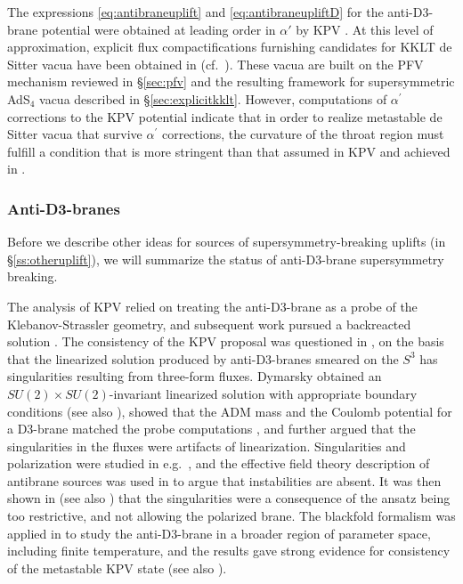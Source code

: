 \documentclass[12pt,a4wide]{article}
\begin{document}
The expressions \eqref{eq:antibraneuplift} and \eqref{eq:antibraneupliftD} for the anti-D3-brane potential were obtained at leading order in $\alpha'$ by KPV \cite{Kachru:2002gs}.  At this level of approximation, 
explicit flux compactifications furnishing candidates for KKLT de Sitter vacua have been obtained in \cite{coni} (cf.~\cite{dstalk}).  These vacua are built on the PFV mechanism reviewed in \S\ref{sec:pfv} and the resulting framework for supersymmetric AdS$_4$ vacua described in \S\ref{sec:explicitkklt}.  However, computations of $\alpha^\prime$ corrections to the KPV potential \cite{Hebecker:2022zme,Schreyer:2022len} indicate that 
in order to realize metastable de Sitter vacua that survive $\alpha^\prime$ corrections, the curvature of the throat region must fulfill a condition that is more stringent than that assumed in KPV and achieved in \cite{coni}.  
 
 
  

\subsubsection{Anti-D3-branes} \label{sec:antibrane}

Before we describe other ideas for sources of supersymmetry-breaking uplifts (in \S\ref{ss:otheruplift}), we will summarize the status of anti-D3-brane supersymmetry breaking.  

The analysis of KPV relied on treating the anti-D3-brane as a probe of the Klebanov-Strassler geometry, and subsequent work pursued a backreacted solution \cite{DeWolfe:2008zy,McGuirk:2009xx}.
The consistency of the KPV proposal was questioned in \cite{Bena:2009xk}, on the basis that the linearized solution produced by anti-D3-branes smeared on the $S^3$ has singularities resulting from three-form fluxes.
Dymarsky obtained an $SU(2) \times SU(2)$-invariant linearized solution with appropriate boundary conditions \cite{Dymarsky:2011pm} (see also \cite{Bena:2011hz,Bena:2011wh}), showed that the ADM mass and the Coulomb potential for a D3-brane matched the probe computations \cite{Kachru:2003sx}, and further argued that the singularities in the fluxes were artifacts of linearization.
Singularities and polarization were studied in e.g.~\cite{Blaback:2011pn,Gautason:2013zw,Junghans:2014xfa},
and the effective field theory description of antibrane sources
was used in \cite{Michel:2014lva,Polchinski:2015bea} to argue that instabilities are absent.
It was then shown in \cite{Cohen-Maldonado:2015lyb,Cohen-Maldonado:2016cjh} (see also \cite{Hartnett:2015oda}) that the singularities were a consequence of the ansatz being too restrictive, and not allowing the polarized brane. 
The blackfold formalism was applied in \cite{Armas:2018rsy} to study the anti-D3-brane in a broader region of parameter space, including finite temperature, and the results gave strong evidence for consistency of the metastable KPV state (see also \cite{Blaback:2019ucp,Nguyen:2019syc,Nguyen:2021srl}).
\end{document}
